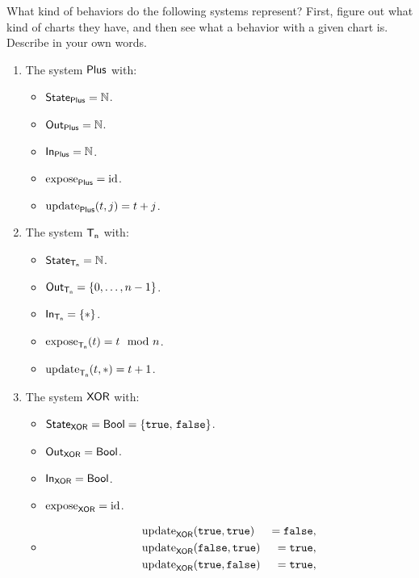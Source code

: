 \documentclass[DynamicalBook]{subfiles}
\begin{document}
\begin{exercise}\label{ex.represents_what_discrete}
  What kind of behaviors do the following systems represent? First, figure out
  what kind of charts they have, and then see what a behavior with a given chart
  is. Describe in your own words.

  \begin{enumerate}
  \item The system $\mathsf{Plus}$ with:
    \begin{itemize}
    \item $\mathsf{State}_{\mathsf{Plus}} = \mathbb{N}$.
    \item $\mathsf{Out}_{\mathsf{Plus}} = \mathbb{N}$.
    \item $\mathsf{In}_{\mathsf{Plus}} = \mathbb{N}$.
    \item $\mathrm{expose}_{\mathsf{Plus}} = \mathrm{id}$.
    \item $\mathrm{update}_{\mathsf{Plus}}(t, j) = t + j$.
    \end{itemize}
  \item The system $\mathsf{T_n}$ with:
    \begin{itemize}
    \item $\mathsf{State}_{\mathsf{T_n}} = \mathbb{N}$.
    \item $\mathsf{Out}_{\mathsf{T_n}} = \{0, \ldots, n - 1\}$.
    \item $\mathsf{In}_{\mathsf{T_n}} = \{\ast\}$.
    \item $\mathrm{expose}_{\mathsf{T_n}}(t) = t \mod n$.
    \item $\mathrm{update}_{\mathsf{T_n}}(t, \ast) = t + 1$.
    \end{itemize}
  \item The system $\mathsf{XOR}$ with:
    \begin{itemize}
    \item $\mathsf{State}_{\mathsf{XOR}} = \mathsf{Bool} = \{\mathtt{true},\, \mathtt{false}\}$.
    \item $\mathsf{Out}_{\mathsf{XOR}} = \mathsf{Bool}$.
    \item $\mathsf{In}_{\mathsf{XOR}} = \mathsf{Bool}$.
    \item $\mathrm{expose}_{\mathsf{XOR}} = \mathrm{id}$.
    \item \[\begin{aligned}
        &\update{XOR}(\true, \true) &= \false, \\
        &\update{XOR}(\false, \true) &= \true, \\
        &\update{XOR}(\true, \false) &= \true, \\

\end{aligned}\]
\end{itemize}
\end{enumerate}
\end{exercise}
\end{document}
